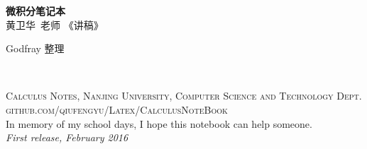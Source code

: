 \documentclass[11pt,fleqn]{book} %
\begin{document}

\begingroup
\thispagestyle{empty}
\centering
\vspace*{4.25cm}
\par\normalfont\fontsize{48}{48}\sffamily\selectfont
\textbf{微积分\hspace{0.6em}笔记本}\\ %
\vspace*{0.4cm}
{\Huge 黄卫华~老师\hspace{0.2em} 《讲稿》}\par %
{\Huge Godfray \hspace{0.2em}整理}\par %
\endgroup


\newpage
~\vfill
\thispagestyle{empty}


\noindent \textsc{Calculus Notes, Nanjing University, Computer Science and Technology Dept.}\\

\noindent \textsc{github.com/qiufengyu/Latex/CalculusNoteBook}\\ %

\noindent In memory of my school days, I hope this notebook can help someone.\\ %

\noindent \textit{First release, February 2016} %



\pagestyle{empty} %

\tableofcontents %
\end{document}
